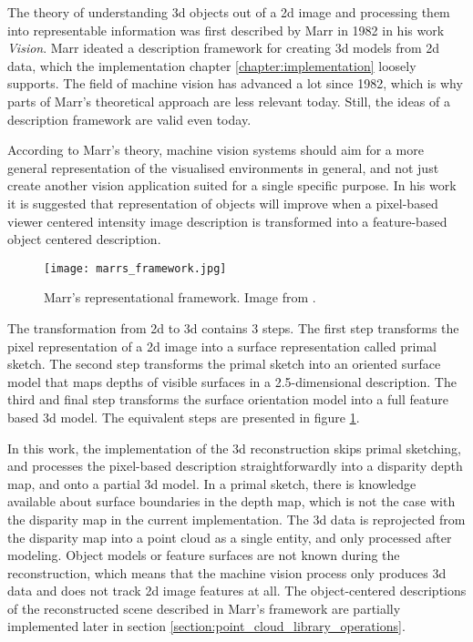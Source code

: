 \documentclass[12pt,a4paper,oneside,pdftex]{report}
\begin{document}
{The theory of understanding 3d objects out of a 2d image and processing them into representable information was first described by Marr in 1982 in his work \emph{Vision}. Marr ideated a description framework for creating 3d models from 2d data, which the implementation chapter \ref{chapter:implementation} loosely supports. The field of machine vision has advanced a lot since 1982, which is why parts of Marr's theoretical approach are less relevant today. Still, the ideas of a description framework are valid even today.

According to Marr's theory, machine vision systems should aim for a more general representation of the visualised environments in general, and not just create another vision application suited for a single specific purpose. In his work it is suggested that representation of objects will improve when a pixel-based viewer centered intensity image description is transformed into a feature-based object centered description.

\begin{figure}[ht]
  \begin{center}
    \texttt{[image: marrs\_framework.jpg]}
    \caption{Marr's representational framework. Image from \citep{Marr82}.}
    \label{fig:marrs_framework}
  \end{center}
\end{figure}

The transformation from 2d to 3d contains 3 steps. The first step transforms the pixel representation of a 2d image into a surface representation called primal sketch. The second step transforms the primal sketch into an oriented surface model that maps depths of visible surfaces in a 2.5-dimensional description. The third and final step transforms the surface orientation model into a full feature based 3d model. The equivalent steps are presented in figure \ref{fig:marrs_framework}.

In this work, the implementation of the 3d reconstruction skips primal sketching, and processes the pixel-based description straightforwardly into a disparity depth map, and onto a partial 3d model. In a primal sketch, there is knowledge available about surface boundaries in the depth map, which is not the case with the disparity map in the current implementation. The 3d data is reprojected from the disparity map into a point cloud as a single entity, and only processed after modeling. Object models or feature surfaces are not known during the reconstruction, which means that the machine vision process only produces 3d data and does not track 2d image features at all. The object-centered descriptions of the reconstructed scene described in Marr's framework are partially implemented later in section \ref{section:point_cloud_library_operations}.

}
\end{document}
